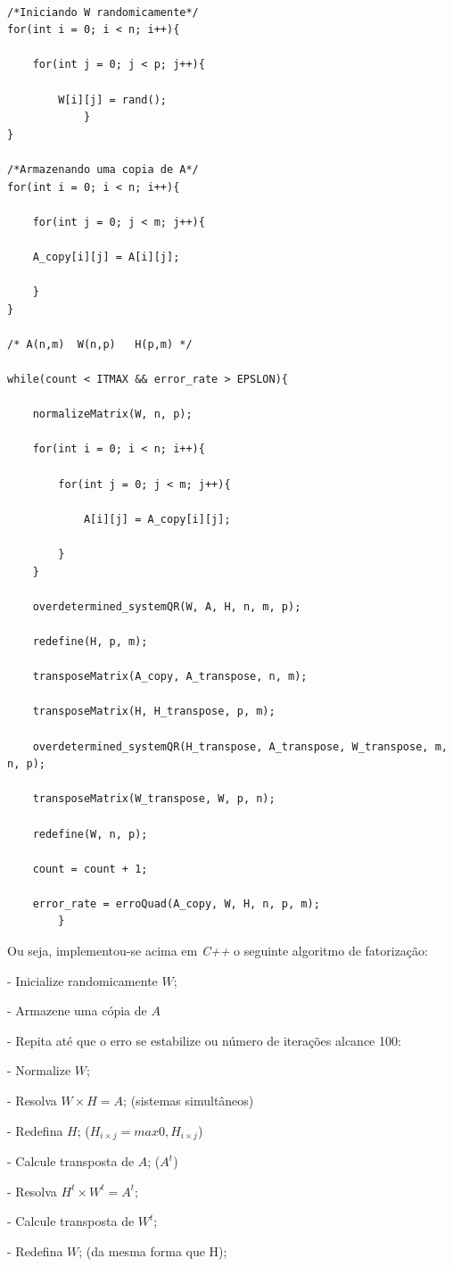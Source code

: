 \documentclass[twocolumn,amsmath,amssymb,floatfix]{revtex4}
\begin{document}
\begin{lstlisting}

/*Iniciando W randomicamente*/
for(int i = 0; i < n; i++){

	for(int j = 0; j < p; j++){

		W[i][j] = rand();
			}
}
		
/*Armazenando uma copia de A*/
for(int i = 0; i < n; i++){

	for(int j = 0; j < m; j++){

	A_copy[i][j] = A[i][j];
	
	}
}

/* A(n,m)  W(n,p)   H(p,m) */

while(count < ITMAX && error_rate > EPSLON){

	normalizeMatrix(W, n, p);

	for(int i = 0; i < n; i++){

		for(int j = 0; j < m; j++){

			A[i][j] = A_copy[i][j];
			
		}
	}

	overdetermined_systemQR(W, A, H, n, m, p);

	redefine(H, p, m);
		
	transposeMatrix(A_copy, A_transpose, n, m);

    transposeMatrix(H, H_transpose, p, m);

	overdetermined_systemQR(H_transpose, A_transpose, W_transpose, m, n, p); 

	transposeMatrix(W_transpose, W, p, n);

	redefine(W, n, p);

	count = count + 1;
	
	error_rate = erroQuad(A_copy, W, H, n, p, m);
		}
\end{lstlisting}

Ou seja, implementou-se acima em \textit{C++} o seguinte algoritmo de fatorização:

- Inicialize randomicamente $W$;

- Armazene uma cópia de $A$

- Repita até que o erro se estabilize ou número de iterações alcance 100:

\begin{flushright}	

- Normalize $W$;

- Resolva $W \times H = A$; (sistemas simultâneos) 
	
- Redefina $H$; ($H_{i \times j} = max{0, H_{i \times j}}$)

- Calcule transposta de $A$; ($A^t$)

- Resolva $H^t \times W^t = A^t$;

- Calcule transposta de $W^t$;

- Redefina $W$; (da mesma forma que H);

\end{flushright}
\end{document}
